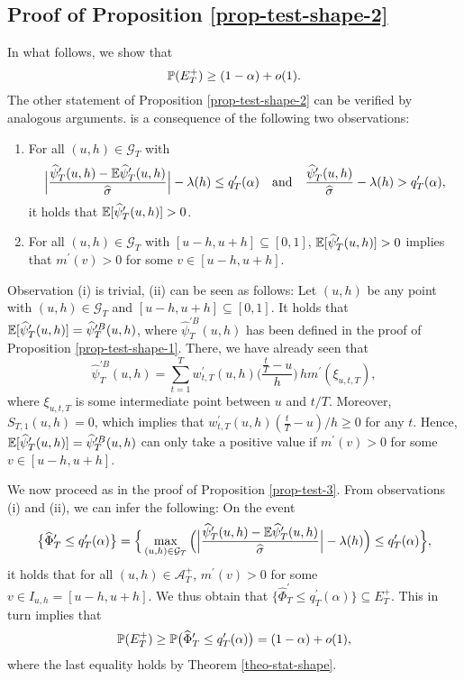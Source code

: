 \documentclass[a4paper,12pt]{article}
\makeatletter
\renewcommand{\eqref}[1]{\tagform@{\ref{#1}}}
\makeatother
\begin{document}
\subsection*{Proof of Proposition \ref{prop-test-shape-2}}


In what follows, we show that 
\begin{equation}\label{claim-prop-test-shape-2}
\mathbb{P}(E_T^+) \ge (1-\alpha) + o(1). 
\end{equation}
The other statement of Proposition \ref{prop-test-shape-2} can be verified by analogous arguments. \eqref{claim-prop-test-shape-2} is a consequence of the following two observations:  
\begin{enumerate}[label=(\roman*),leftmargin=0.75cm]

\item For all $(u,h) \in \mathcal{G}_T$ with   
\[ \Big|\frac{\widehat{\psi}_T^\prime(u,h) - \mathbb{E} \widehat{\psi}_T^\prime(u,h)}{\widehat{\sigma}}\Big| - \lambda(h) \le q_T^\prime(\alpha) \quad \text{and} \quad \frac{\widehat{\psi}_T^\prime(u,h)}{\widehat{\sigma}} - \lambda(h) > q_T^\prime(\alpha), \]
it holds that $\mathbb{E}[\widehat{\psi}_T^\prime(u,h)] > 0$. 

\item For all $(u,h) \in \mathcal{G}_T$ with $[u-h,u+h] \subseteq [0,1]$,  $\mathbb{E}[\widehat{\psi}_T^\prime(u,h)] > 0$ implies that $m^\prime(v) > 0$ for some $v \in [u-h,u+h]$. 

\end{enumerate}
Observation (i) is trivial, (ii) can be seen as follows: Let $(u,h)$ be any point with $(u,h) \in \mathcal{G}_T$ and $[u-h,u+h] \subseteq [0,1]$. It holds that $\mathbb{E}[\widehat{\psi}_T^\prime(u,h)] = \widehat{\psi}_T^{\prime B}(u,h)$, where $\widehat{\psi}_T^{\prime B}(u,h)$ has been defined in the proof of Proposition \ref{prop-test-shape-1}. There, we have already seen that  
\[ \widehat{\psi}_T^{\prime B}(u,h) = \sum\limits_{t=1}^T w_{t,T}^\prime(u,h) \Big( \frac{\frac{t}{T} - u}{h} \Big) \, h m^\prime(\xi_{u,t,T}), \]
where $\xi_{u,t,T}$ is some intermediate point between $u$ and $t/T$. Moreover, $S_{T,1}(u,h) = 0$, which implies that $w_{t,T}^\prime(u,h) (\frac{t}{T} - u)/h \ge 0$ for any $t$. Hence, $\mathbb{E}[\widehat{\psi}_T^\prime(u,h)] = \widehat{\psi}_T^{\prime B}(u,h)$ can only take a positive value if $m^\prime(v) > 0$ for some $v \in [u-h,u+h]$. 


We now proceed as in the proof of Proposition \ref{prop-test-3}. From observations (i) and (ii), we can infer the following: On the event 
\[ \big\{ \widehat{\Phi}_T^\prime \le q_T^\prime(\alpha) \big\} = \Big\{ \max_{(u,h) \in \mathcal{G}_T} \Big( \Big|\frac{\widehat{\psi}_T^\prime(u,h) - \mathbb{E} \widehat{\psi}_T^\prime(u,h)}{\widehat{\sigma}}\Big| - \lambda(h) \Big) \le q_T^\prime(\alpha) \Big\}, \]
it holds that for all $(u,h) \in \mathcal{A}_T^+$, $m^\prime(v) > 0$ for some $v \in I_{u,h} = [u-h,u+h]$. We thus obtain that $\{ \widehat{\Phi}_T^\prime \le q_T^\prime(\alpha) \} \subseteq E_T^+$. This in turn implies that 
\[ \mathbb{P}(E_T^+) \ge \mathbb{P} \big(  \widehat{\Phi}_T^\prime \le q_T^\prime(\alpha) \big) = (1-\alpha) + o(1), \]
where the last equality holds by Theorem \ref{theo-stat-shape}. 
\end{document}
